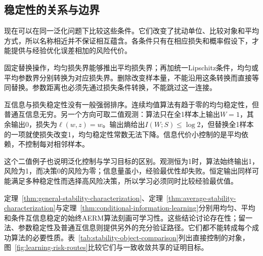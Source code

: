 \subsection{稳定性的关系与边界}
\label{sec:stability-comparison}

现在可以在同一泛化问题下比较这些条件。它们改变了扰动单位、比较对象和平均方式，所以名称相近并不保证相互蕴含。各条件只有在相应损失和概率假设下，才能提供与经验优化误差相加的风险代价。

固定替换操作，均匀损失界能够推出平均损失界；再加统一Lipschitz条件，均匀或平均参数界分别转换为对应损失界。删除改变样本量，不能沿用这条转换而直接等同替换。参数距离也必须先通过损失条件转换，不能跳过这一连接。

互信息与损失稳定性没有一般强弱排序。连续均值算法有趋于零的均匀稳定性，但普通互信息无穷。另一个方向可取二值观测：算法只在全1样本上输出$W=1$，其余输出0，损失为$\ell(w,z)=w$。输出熵给出$I(W;S)\leq\log2$，但替换全1样本的一项就使损失改变1，均匀稳定性常数无法下降。信息代价小控制的是平均依赖，不控制每对相邻样本。

这个二值例子也说明泛化控制与学习目标的区别。观测恒为1时，算法始终输出1，风险为1，而决策0的风险为零；信息量虽小，经验最优性却失败。恒定输出同样可能满足多种稳定性而选择高风险决策，所以学习必须同时比较经验最优值。

定理~\ref{thm:general-stability-characterization}、定理~\ref{thm:average-stability-characterization}与定理~\ref{thm:conditional-information-learning}分别用均匀、平均和条件互信息稳定的始终AERM算法刻画可学习性。这些结论讨论存在性；留一法、参数稳定性及普通互信息则提供另外的充分验证路径。它们都不能转成每个成功算法的必要性质。表~\ref{tab:stability-object-comparison}列出直接控制的对象，图~\ref{fig:learning-risk-routes}比较它们与一致收敛共享的证明目标。

